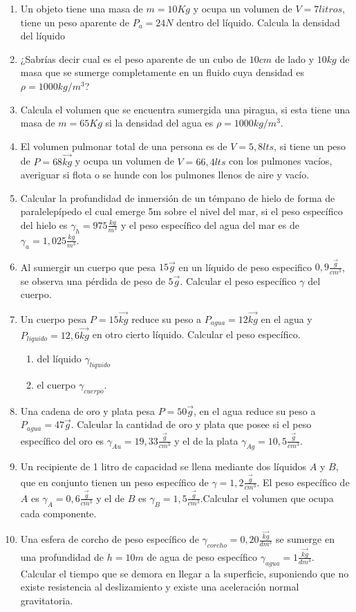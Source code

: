 \documentclass[../main]{subfiles}
\begin{document}
\begin{enumerate}
  \item Un objeto tiene una masa de $m=10Kg$ y ocupa un volumen de $V=7
    litros$, tiene un peso aparente de $P_a=24N$ dentro del líquido.
    Calcula la densidad del líquido
  \item ¿Sabrías decir cual es el peso aparente de un cubo de $10cm$ de
    lado y $10kg$ de masa que se sumerge completamente en un fluido cuya
    densidad es  $\rho=1000kg/m^3$?
  \item  Calcula el volumen que se encuentra sumergida una piragua, si
    esta tiene una masa de $m=65Kg$ si la densidad del agua es
    $\rho=1000 kg/m^3$.
  \item El volumen pulmonar total de una persona es de $V=5,8lts$, si
    tiene un peso de $P=68\vec{kg}$ y ocupa un volumen de $V=66,4lts$ con
    los pulmones vacíos, averiguar si flota o se hunde con los pulmones
    llenos de aire y vacío.
  \item Calcular la profundidad de inmersión de un témpano de hielo de
    forma de paralelepípedo el cual emerge 5m sobre el nivel del mar, si
    el peso específico del hielo es $\gamma_h=975\frac{kg}{m^3}$ y el
    peso específico del agua del mar es de $\gamma_a=1,025\frac{kg}{m^3}$.
  \item Al sumergir un cuerpo que pesa $15\vec{g}$ en un líquido de
    peso especifico $0,9\frac{\vec{g}}{cm^3}$, se observa una pérdida de
    peso de $5\vec{g}$. Calcular el peso específico $\gamma$ del cuerpo.
  \item Un cuerpo pesa $P=15\vec{kg}$ reduce su peso a
    $P_{agua}=12\vec{kg}$ en el agua y $P_{liquido}=12,6\vec{kg}$ en otro
    cierto líquido. Calcular el peso específico.
    \begin{enumerate}
      \item  del líquido
        $\gamma_{liquido}$
      \item el cuerpo $\gamma_{cuerpo}$.
    \end{enumerate}
  \item Una cadena de oro y plata pesa $P=50\vec{g}$, en el agua reduce
    su peso a $P_{agua}=47\vec{g}$. Calcular la cantidad de oro y plata
    que posee si el peso específico del oro es
    $\gamma_{Au}=19,33\frac{\vec{g}}{cm^3}$ y el de la plata
    $\gamma_{Ag}=10,5\frac{\vec{g}}{cm^3}$.
  \item Un recipiente de 1 litro de capacidad se llena mediante dos
    líquidos $A$ y $B$, que en conjunto tienen un peso específico de
    $\gamma=1,2\frac{\vec{g}}{cm^3}$. El peso específico de $A$ es
    $\gamma_A=0,6\frac{\vec{g}}{cm^3}$ y el de $B$ es
    $\gamma_B=1,5\frac{\vec{g}}{cm^3}$.Calcular el volumen que ocupa cada
    componente.
  \item Una esfera de corcho de peso específico de
    $\gamma_{corcho}=0,20\frac{\vec{kg}}{dm^3}$ se sumerge en una
    profundidad de $h=10m$ de agua de peso específico
    $\gamma_{agua}=1\frac{\vec{kg}}{dm^3}$. Calcular el tiempo que se
    demora en llegar a la superficie, suponiendo que no existe
    resistencia al deslizamiento y existe una aceleración normal gravitatoria.


\end{enumerate}
\end{document}
